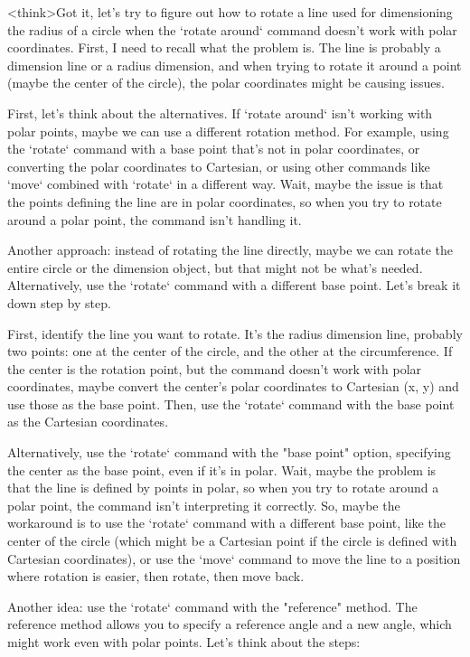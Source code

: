 <think>Got it, let's try to figure out how to rotate a line used for dimensioning the radius of a circle when the `rotate around` command doesn't work with polar coordinates. First, I need to recall what the problem is. The line is probably a dimension line or a radius dimension, and when trying to rotate it around a point (maybe the center of the circle), the polar coordinates might be causing issues. 

First, let's think about the alternatives. If `rotate around` isn't working with polar points, maybe we can use a different rotation method. For example, using the `rotate` command with a base point that's not in polar coordinates, or converting the polar coordinates to Cartesian, or using other commands like `move` combined with `rotate` in a different way. Wait, maybe the issue is that the points defining the line are in polar coordinates, so when you try to rotate around a polar point, the command isn't handling it. 

Another approach: instead of rotating the line directly, maybe we can rotate the entire circle or the dimension object, but that might not be what's needed. Alternatively, use the `rotate` command with a different base point. Let's break it down step by step. 

First, identify the line you want to rotate. It's the radius dimension line, probably two points: one at the center of the circle, and the other at the circumference. If the center is the rotation point, but the command doesn't work with polar coordinates, maybe convert the center's polar coordinates to Cartesian (x, y) and use those as the base point. Then, use the `rotate` command with the base point as the Cartesian coordinates. 

Alternatively, use the `rotate` command with the "base point" option, specifying the center as the base point, even if it's in polar. Wait, maybe the problem is that the line is defined by points in polar, so when you try to rotate around a polar point, the command isn't interpreting it correctly. So, maybe the workaround is to use the `rotate` command with a different base point, like the center of the circle (which might be a Cartesian point if the circle is defined with Cartesian coordinates), or use the `move` command to move the line to a position where rotation is easier, then rotate, then move back. 

Another idea: use the `rotate` command with the "reference" method. The reference method allows you to specify a reference angle and a new angle, which might work even with polar points. Let's think about the steps:


